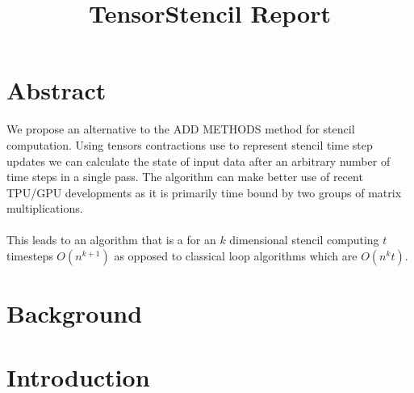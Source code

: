 \documentclass{article}
\begin{document}

\title{TensorStencil Report}


\maketitle





\section{Abstract}
We propose an alternative to the ADD METHODS method for stencil computation.
Using tensors contractions use to represent stencil time step updates we can calculate the state of input data after an arbitrary number of time steps in a single pass.
The algorithm can make better use of recent TPU/GPU developments as it is primarily time bound by two groups of matrix multiplications.
\\ \\ This leads to an algorithm that is a for an $k$ dimensional stencil computing $t$ timesteps $O(n^{k+1})$ as opposed to classical loop algorithms which are $O(n^{k}t)$.

\section{Background}


\section{Introduction}
\end{document}
